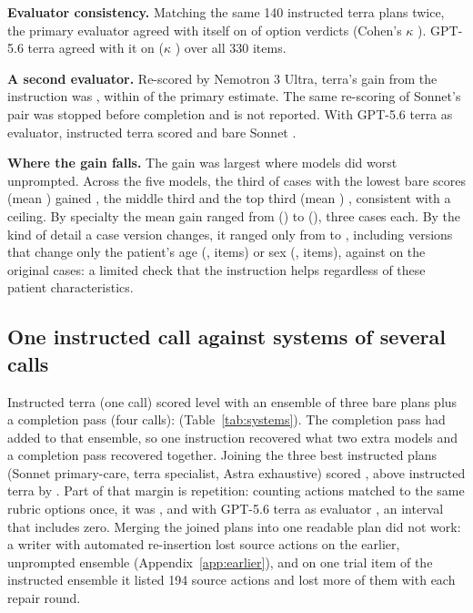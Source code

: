 \documentclass[11pt]{article}
\begin{document}
\textbf{Evaluator consistency.} Matching the same 140 instructed terra plans twice, the primary
evaluator agreed with itself on \covRetestAgree{} of option verdicts (Cohen's $\kappa$
\covRetestKappa{}). GPT-5.6 terra agreed with it on \covCrossTerraAgree{} ($\kappa$
\covCrossTerraKappa{}) over all 330 items.

\textbf{A second evaluator.} Re-scored by Nemotron 3 Ultra, terra's gain from the instruction was
\covDPromptTerraJF{}, within \covInteractionTerraJF{} of the primary estimate. The same re-scoring of
Sonnet's pair was stopped before completion and is not reported. With GPT-5.6 terra as evaluator,
instructed terra scored \covFTerraSpecJT{} and bare Sonnet \covFSonnetBareJT{}.

\textbf{Where the gain falls.} The gain was largest where models did worst unprompted. Across the
five models, the third of cases with the lowest bare scores (mean \covTercileLowBare{}) gained
\covTercileLowGain{}, the middle third \covTercileMidGain{} and the top third (mean
\covTercileHighBare{}) \covTercileHighGain{}, consistent with a ceiling. By specialty the mean gain
ranged from \covSpecialtyMin{} (\covSpecialtyMinName) to \covSpecialtyMax{} (\covSpecialtyMaxName),
three cases each. By the kind of detail a case version changes, it ranged only from \covPerturbMin{}
to \covPerturbMax{}, including versions that change only the patient's age (\covPerturbAge{},
\covPerturbAgeItems{} items) or sex (\covPerturbSex{}, \covPerturbSexItems{} items), against
\covPerturbBaseline{} on the original cases: a limited check that the instruction helps regardless of
these patient characteristics.

\subsection{One instructed call against systems of several calls}
\label{sec:systems}
Instructed terra (one call) scored level with an ensemble of three bare plans plus a completion pass
(four calls): \covDTerraSpecVsGap{} (Table~\ref{tab:systems}). The completion pass had added
\covDGapVsUnion{} to that ensemble, so one instruction recovered what two extra models and a
completion pass recovered together. Joining the three best instructed plans (Sonnet primary-care,
terra specialist, Astra exhaustive) scored \covFUnionPrompt{}, above instructed terra by
\covDUnionPromptVsTerraSpec{}. Part of that margin is repetition: counting actions matched to the
same rubric options once, it was \covDDedupUnionPromptVsTerraSpec{}, and with GPT-5.6 terra as
evaluator \covDDedupUnionPromptVsTerraSpecJT{}, an interval that includes zero. Merging the joined
plans into one readable plan did not work: a writer with automated re-insertion lost source actions
on the earlier, unprompted ensemble (Appendix~\ref{app:earlier}), and on one trial item of the
instructed ensemble it listed 194 source actions and lost more of them with each repair round.
\end{document}
